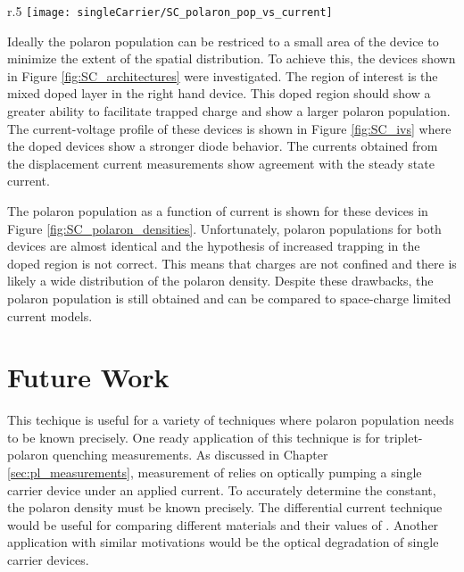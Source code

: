 \documentclass[../thesis.tex]{subfiles}
\begin{document}
\begin{wrapfigure}{r}{.5\textwidth}
    \centering%
    \texttt{[image: singleCarrier/SC\_polaron\_pop\_vs\_current]}
    \caption{Polaron population as a function of current for the devices in Figure \ref{fig:SC_architectures}}
    \label{fig:SC_polaron_densities}
\end{wrapfigure}

Ideally the polaron population can be restriced to a small area of the device to minimize the extent of the spatial distribution.  
To achieve this, the devices shown in Figure \ref{fig:SC_architectures} were investigated.
The region of interest is the mixed doped layer in the right hand device.
This doped region should show a greater ability to facilitate trapped charge and show a larger polaron population.
The current-voltage profile of these devices is shown in Figure \ref{fig:SC_ivs} where the doped devices show a stronger diode behavior.
The currents obtained from the displacement current measurements show agreement with the steady state current.

The polaron population as a function of current is shown for these devices in Figure \ref{fig:SC_polaron_densities}.
Unfortunately, polaron populations for both devices are almost identical and the hypothesis of increased trapping in the doped region is not correct.
This means that charges are not confined and there is likely a wide distribution of the polaron density.
Despite these drawbacks, the polaron population is still obtained and can be compared to space-charge limited current models.

\section{Future Work}

This techique is useful for a variety of techniques where polaron population needs to be known precisely.
One ready application of this technique is for triplet-polaron quenching measurements.
As discussed in Chapter \ref{sec:pl_measurements}, measurement of \ktp relies on optically pumping a single carrier device under an applied current.
To accurately determine the constant, the polaron density must be known precisely.
The differential current technique would be useful for comparing different materials and their values of \ktp.
Another application with similar motivations would be the optical degradation of single carrier devices.  
\end{document}

